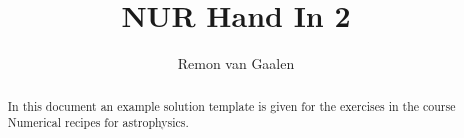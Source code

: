\documentclass[a4paper,10pt]{article}
\title{NUR Hand In 2}
\author{Remon van Gaalen}
\begin{document}
\maketitle

\begin{abstract}
 In this document an example solution template is given for the exercises in the 
 course Numerical recipes for astrophysics.
\end{abstract}


\end{document}
